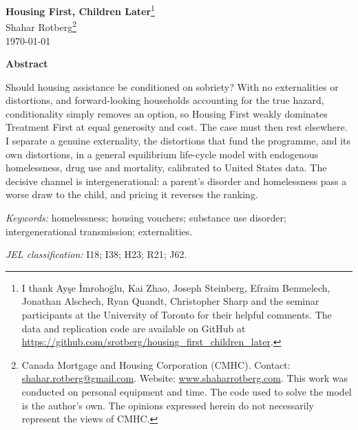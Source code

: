 \documentclass[10pt]{article}
\begin{document}
\begin{center}\end{center}

\begin{center}
\renewcommand{\thefootnote}{\fnsymbol{footnote}}
{\Large\bfseries Housing First, Children Later}\footnote{I thank Ay\c{s}e \.{I}mroho\u{g}lu, Kai Zhao, Joseph Steinberg, Efraim Benmelech, Jonathan Alschech, Ryan Quandt, Christopher Sharp and the seminar participants at the University of Toronto for their helpful comments. The data and replication code are available on GitHub at \url{https://github.com/srotberg/housing_first_children_later}.}\\[0.6em]
{\large Shahar Rotberg}\footnote{Canada Mortgage and Housing Corporation (CMHC). Contact: \url{shahar.rotberg@gmail.com}. Website: \url{www.shaharrotberg.com}. This work was conducted on personal equipment and time. The code used to solve the model is the author's own. The opinions expressed herein do not necessarily represent the views of CMHC.}\\[0.35em]
\today
\end{center}
\renewcommand{\thefootnote}{\arabic{footnote}}
\setcounter{footnote}{0}

\vspace{0.4em}
\begin{center}
\begin{minipage}{0.86\textwidth}
\begin{center}\textbf{Abstract}\end{center}
\noindent Should housing assistance be conditioned on sobriety? With no externalities
or distortions, and forward-looking households accounting for the true hazard,
conditionality simply removes an option, so Housing First weakly dominates Treatment First at equal
generosity and cost. The case must then rest elsewhere. I separate a genuine
externality, the distortions that fund the programme, and its own distortions, in
a general equilibrium life-cycle model with endogenous homelessness, drug use and
mortality, calibrated to United States data. The decisive channel is intergenerational: a
parent's disorder and homelessness pass a worse draw to the child, and pricing it
reverses the ranking.

\vspace{0.6em}
\noindent\textit{Keywords:} homelessness; housing vouchers; substance
use disorder; intergenerational transmission; externalities.

\vspace{0.2em}
\noindent\textit{JEL classification:} I18; I38; H23; R21; J62.
\end{minipage}
\end{center}
\end{document}
